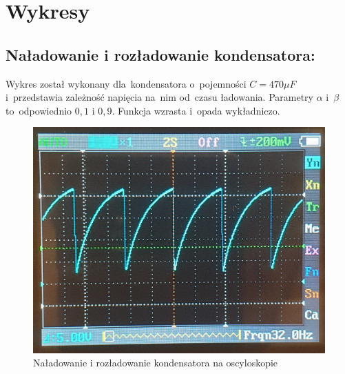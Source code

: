 \documentclass[12pt]{mwart}
\begin{document}
	\section{Wykresy}\label{wykresy}
	\subsection{Naładowanie i rozładowanie kondensatora:}
	\noindent Wykres został wykonany dla~kondensatora o~pojemności $C=470\mu F$ i~przedstawia zależność napięcia na~nim od~czasu ładowania. Parametry $\alpha$ i~$\beta$ to~odpowiednio $0,1$ i $0,9$. Funkcja wzrasta i~opada wykładniczo.
	\begin{figure}[H]
		\centering
		\includegraphics[scale=0.2]{data/oscyloskop.jpg}
		\caption{Naładowanie i rozładowanie kondensatora na oscyloskopie}
	\end{figure}
\end{document}
